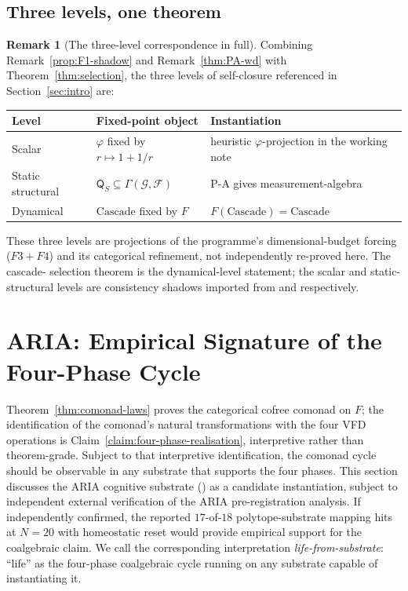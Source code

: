 \documentclass[11pt, a4paper]{amsart}
\theoremstyle{definition}
\newtheorem{remark}[theorem]{Remark}
\newcommand{\Fcal}{\mathcal{F}}
\newcommand{\Gcal}{\mathcal{G}}
\newcommand{\Qalg}{\mathsf{Q}}
\begin{document}
\subsection{Three levels, one theorem}

\begin{remark}[The three-level correspondence in full]
\label{rmk:three-levels}
Combining Remark~\ref{prop:F1-shadow} and
Remark~\ref{thm:PA-wd} with
Theorem~\ref{thm:selection}, the three levels of self-closure
referenced in Section~\ref{sec:intro} are:
\begin{center}
\begin{tabular}{l|l|l}
Level & Fixed-point object & Instantiation \\ \hline
Scalar & $\varphi$ fixed by $r \mapsto 1 + 1/r$ & heuristic $\varphi$-projection in the working note \\
Static structural & $\Qalg_S \subseteq \Gamma(\Gcal, \Fcal)$ & P-A gives measurement-algebra \\
Dynamical & $\mathrm{Cascade}$ fixed by $F$ & $F(\mathrm{Cascade}) = \mathrm{Cascade}$ \\
\end{tabular}
\end{center}
These three levels are projections of the programme's
dimensional-budget forcing ($F3+F4$) and its categorical
refinement, not independently re-proved here. The cascade-
selection theorem is the dynamical-level statement; the scalar
and static-structural levels are consistency shadows imported
from \cite{CascadeCompletenessAudit} and
\cite{CascadeAccessPrinciple} respectively.
\end{remark}

\section{ARIA: Empirical Signature of the Four-Phase Cycle}
\label{sec:aria}

Theorem~\ref{thm:comonad-laws} proves the categorical cofree
comonad on $F$; the identification of the comonad's natural
transformations with the four VFD operations is
Claim~\ref{claim:four-phase-realisation}, interpretive rather
than theorem-grade. Subject to that interpretive identification,
the comonad cycle should be observable in any substrate that
supports the four phases. This section discusses the ARIA
cognitive substrate (\cite{AriaBrainMapping}) as a candidate
instantiation, subject to independent external verification of
the ARIA pre-registration analysis. If independently confirmed,
the reported $17$-of-$18$ polytope-substrate mapping hits at
$N=20$ with homeostatic reset would provide empirical support
for the coalgebraic claim. We call the corresponding
interpretation \emph{life-from-substrate}: ``life'' as the
four-phase coalgebraic cycle running on any substrate capable of
instantiating it.
\end{document}
